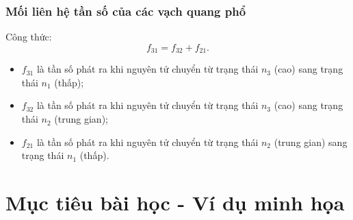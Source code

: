 \subsubsection{Mối liên hệ tần số của các vạch quang phổ}
Công thức:
\begin{equation}
	f_{31} = f_{32}+ f_{21}.
\end{equation}
\begin{itemize}
	\item $f_{31}$ là tần số phát ra khi nguyên tử chuyển từ trạng thái $n_3$ (cao) sang trạng thái $n _1$ (thấp);
	\item $f_{32}$ là tần số phát ra khi nguyên tử chuyển từ trạng thái $n_3$ (cao) sang trạng thái $n _2$ (trung gian);
	\item $f_{21}$ là tần số phát ra khi nguyên tử chuyển từ trạng thái $n_2$ (trung gian) sang trạng thái $n _1$ (thấp).
\end{itemize}

\section{Mục tiêu bài học - Ví dụ minh họa}

